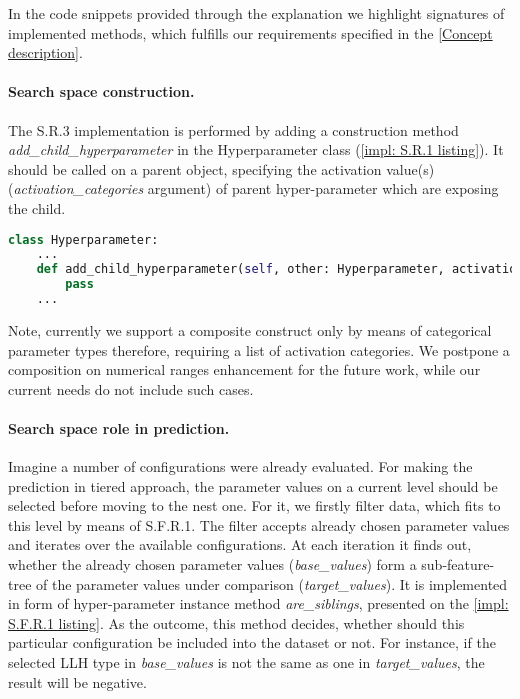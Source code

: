 In the code snippets provided through the explanation we highlight signatures of implemented methods, which fulfills our requirements specified in the \cref{Concept description}.

\paragraph{Search space construction.} The S.R.3 implementation is performed by adding a construction method \emph{add\_child\_hyperparameter} in the Hyperparameter class (\cref{impl: S.R.1 listing}). It should be called on a parent object, specifying the activation value(s) (\emph{activation\_categories} argument) of parent hyper-parameter which are exposing the child. 

\begin{lstlisting}[language=Python, caption=S.R.1 implementation., label=impl: S.R.1 listing]
class Hyperparameter:
	...
	def add_child_hyperparameter(self, other: Hyperparameter, activation_categories: Iterable[CATEGORY]) -> Hyperparameter:
		pass
	...
\end{lstlisting}

Note, currently we support a composite construct only by means of categorical parameter types therefore, requiring a list of activation categories. We postpone a composition on numerical ranges enhancement for the future work, while our current needs do not include such cases.

\paragraph{Search space role in prediction.}
Imagine a number of configurations were already evaluated. For making the prediction in tiered approach, the parameter values on a current level should be selected before moving to the nest one. For it, we firstly filter data, which fits to this level by means of S.F.R.1. The filter accepts already chosen parameter values and iterates over the available configurations. At each iteration it finds out, whether the already chosen parameter values (\emph{base\_values}) form a sub-feature-tree of the parameter values under comparison (\emph{target\_values}). It is implemented in form of hyper-parameter instance method \emph{are\_siblings}, presented on the \cref{impl: S.F.R.1 listing}. As the outcome, this method decides, whether should this particular configuration be included into the dataset or not. For instance, if the selected LLH type in \emph{base\_values} is not the same as one in \emph{target\_values}, the result will be negative.

